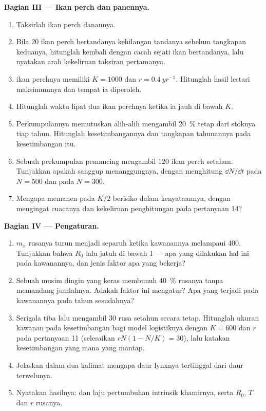 \begin{problem}
\medskip
\noindent\textbf{Bagian III --- Ikan perch dan panennya.}
\begin{enumerate}[resume]
  \item Taksirlah  ikan perch danaunya.
  \item Bila 20 ikan perch bertandanya kehilangan tandanya sebelum
        tangkapan keduanya, hitunglah kembali dengan cacah sejati ikan
        bertandanya, lalu nyatakan arah kekeliruan taksiran
        pertamanya.
  \item {} ikan perchnya memiliki $K = 1000$ dan $r = \qty{0.4}{yr^{-1}}$.
        Hitunglah hasil lestari maksimumnya dan  tempat ia
        diperoleh.
  \item Hitunglah waktu lipat dua  ikan perchnya ketika ia
        jauh di bawah $K$.
  \item Perkumpulannya memutuskan alih-alih mengambil \qty{20}{\%}
        tetap dari stoknya tiap tahun. Hitunglah 
        kesetimbangannya dan tangkapan tahunannya pada kesetimbangan
        itu.
  \item Sebuah perkumpulan pemancing mengambil 120 ikan perch setahun.
        Tunjukkan apakah  sanggup menanggungnya, dengan
        menghitung $\dd N/\dd t$ pada $N =
        500$ dan pada $N = 300$.
  \item Mengapa memanen pada $K/2$ berisiko dalam kenyataannya, dengan
        mengingat cuacanya dan kekeliruan penghitungan pada pertanyaan
        14?
\end{enumerate}

\medskip
\noindent\textbf{Bagian IV --- Pengaturan.}
\begin{enumerate}[resume]
  \item $m_x$ rusanya turun menjadi separuh ketika kawanannya melampaui
        400. Tunjukkan bahwa $R_0$ lalu jatuh di bawah 1 --- apa yang
        dilakukan hal ini pada kawanannya, dan jenis faktor apa yang
        bekerja?
  \item Sebuah musim dingin yang keras membunuh \qty{40}{\%} rusanya
        tanpa memandang jumlahnya. Adakah faktor ini mengatur? Apa yang
        terjadi pada kawanannya pada tahun sesudahnya?
  \item Serigala tiba lalu mengambil 30 rusa setahun secara tetap.
        Hitunglah ukuran kawanan pada kesetimbangan bagi model
        logistiknya dengan $K = 600$ dan $r$ pada pertanyaan 11
        (selesaikan $rN(1 - N/K) = 30$), lalu katakan kesetimbangan
        yang mana yang mantap.
  \item Jelaskan dalam dua kalimat mengapa daur lynxnya tertinggal dari
        daur terwelunya.
  \item Nyatakan hasilnya:  dan laju pertumbuhan intrinsik
        khamirnya, serta $R_0$, $T$ dan $r$ rusanya.
\end{enumerate}
\end{problem}
